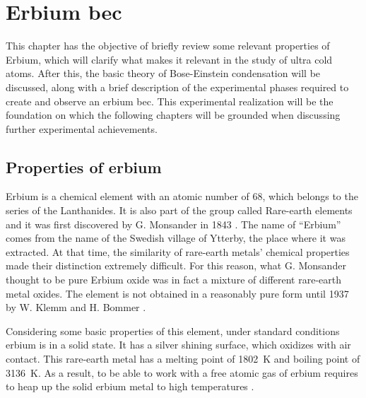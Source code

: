 
\chapter{Erbium \acl*{bec}}
\label{chap:erbium_bec}

This chapter has the objective of briefly review some relevant properties of Erbium, which will clarify what makes it relevant in the study of ultra cold atoms. After this, the basic theory of Bose-Einstein condensation will be discussed, along with a brief description of the experimental phases required to create and observe an erbium \ac{bec}. This experimental realization will be the foundation on which the following chapters will be grounded when discussing further experimental achievements.

\section{Properties of erbium} \label{sec:erbium_properties}
Erbium is a chemical element with an atomic number of 68, which belongs to the series of the Lanthanides. It is also part of the group called Rare-earth elements and it was first discovered by G. Monsander in 1843 \cite{mosander1843xxx}. The name of ``Erbium'' comes from the name of the Swedish village of Ytterby, the place where it was extracted. At that time, the similarity of rare-earth metals' chemical properties made their distinction extremely difficult. For this reason, what G. Monsander thought to be pure Erbium oxide was in fact a mixture of different rare-earth metal oxides. The element is not obtained in a reasonably pure form until 1937 by W. Klemm and H. Bommer \cite{klemm1937bommer}.

Considering some basic properties of this element, under standard conditions erbium is in a solid state. It has a silver shining surface, which oxidizes with air contact. This rare-earth metal has a melting point of \SI{1802}{\kelvin} and boiling point of \SI{3136}{\kelvin}. As a result, to be able to work with a free atomic gas of erbium requires to heap up the solid erbium metal to high temperatures \cite{emsley1998}.

